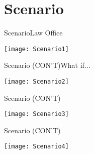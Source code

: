 \section{Scenario}

\begin{frame}{Scenario}{Law Office}
	\begin{center}
		\texttt{[image: Scenario1]}
	\end{center}
\end{frame}

\begin{frame}{Scenario (CON'T)}{What if...}
	\begin{center}
		\texttt{[image: Scenario2]}
	\end{center}
\end{frame}

\begin{frame}{Scenario (CON'T)}
	\begin{center}
		\texttt{[image: Scenario3]}
	\end{center}
\end{frame}

\begin{frame}{Scenario (CON'T)}
	\begin{center}
		\texttt{[image: Scenario4]}
	\end{center}
\end{frame}